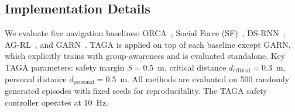 \subsection{Implementation Details}
We evaluate five navigation baselines: ORCA~\cite{orca}, Social Force (SF)~\cite{helbing1995social}, DS-RNN~\cite{liu2020decentralized}, AG-RL~\cite{liu2023intention}, and GARN~\cite{garn2025}. TAGA is applied on top of each baseline except GARN, which explicitly trains with group-awareness and is evaluated standalone. Key TAGA parameters: safety margin $S = 0.5$~m, critical distance $d_{\mathrm{critical}} = 0.3$~m, personal distance $d_{\mathrm{personal}} = 0.5$~m. All methods are evaluated on 500 randomly generated episodes with fixed seeds for reproducibility. The TAGA safety controller operates at 10~Hz.



